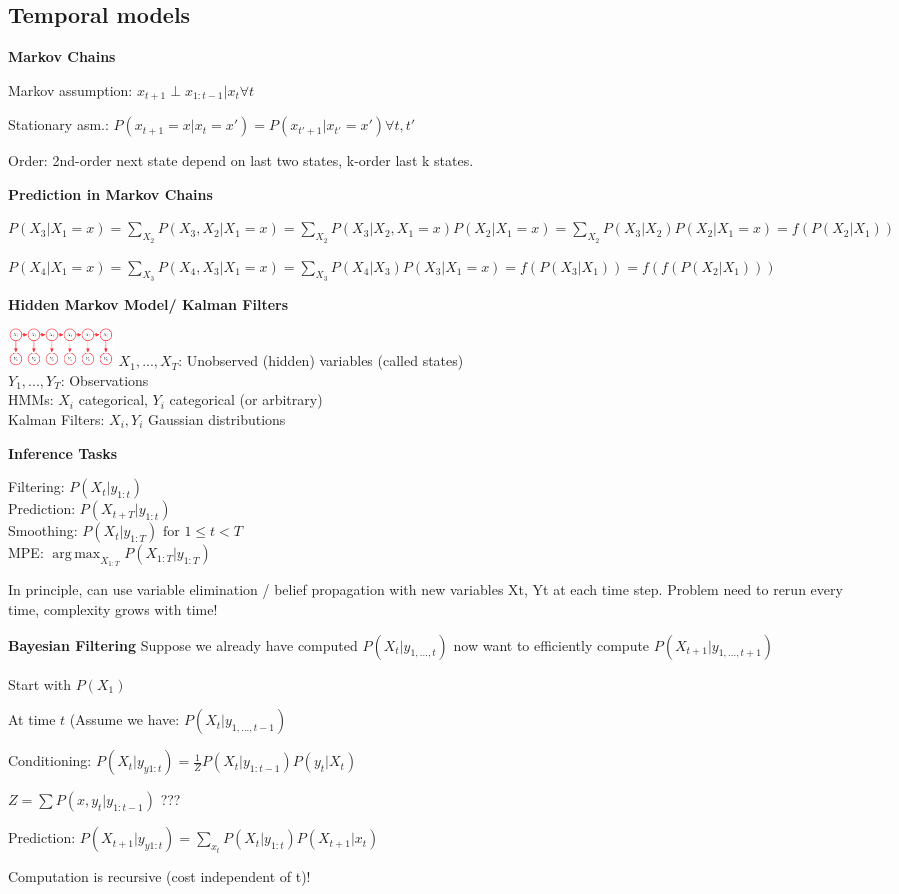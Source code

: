 \documentclass[a4paper, 11pt]{scrartcl}
\DeclareMathOperator*{\argmax}{arg\,max}
\begin{document}
\begin{multicols*}{3}
\subsection{Temporal models}

\textbf{Markov Chains}

Markov assumption: $x_{t+1} \perp x_{1:t-1} | x_t \forall t$

Stationary asm.: $P(x_{t+1} = x | x_t = x') = P(x_{t'+1} | x_{t'} = x') \forall t, t'$

Order: 2nd-order next state depend on last two states, k-order last k states. 

\textbf{Prediction in Markov Chains}

$P(X_3 | X_1 = x) = \sum_{X_2}P(X_3,X_2|X_1 = x) = \sum_{X_2}P(X_3 | X_2, X_1 = x)P(X_2 | X_1 = x) =  \sum_{X_2}P(X_3 | X_2)P(X_2 | X_1 = x) = f(P(X_2|X_1))$

$P(X_4 | X_1 = x) = \sum_{X_3}P(X_4,X_3|X_1 = x) = \sum_{X_3}P(X_4 | X_3)P(X_3 | X_1 = x) = f(P(X_3|X_1)) = f(f(P(X_2 | X_1)))$

\textbf{Hidden Markov Model/ Kalman Filters}

\includegraphics[height=1cm]{img/pai4.png}
$X_1,...,X_T$: Unobserved (hidden) variables (called states) \\
$Y_1,...,Y_T$: Observations \\
HMMs: $X_i$ categorical, $Y_i$ categorical (or arbitrary)\\
Kalman Filters: $X_i, Y_i$ Gaussian distributions

\textbf{Inference Tasks}

Filtering: $P(X_t | y_{1:t} ) $\\
Prediction: $P(X_{t+T} | y_{1:t} )$ \\
Smoothing: $P(X_t | y_{1:T}) \text{ for } 1\leq t < T$\\
MPE: $\argmax_{X_{1:T}} P(X_{1:T} | y_{1:T})$
 
In principle, can use variable elimination / belief propagation with new variables Xt, Yt at
each time step. Problem need to rerun every time, complexity grows with time!

\textbf{Bayesian Filtering}
Suppose we already have computed $P(X_t | y_{1,...,t})$ now want to efficiently compute $P(X_{t+1} | y_{1,...,t+1})$

\begin{compactitem}
	\item Start with $P(X_1)$
	\item At time $t$ (Assume we have:  $P(X_t | y_{1,...,t-1})$
	\item Conditioning: $P(X_t | y_{y1:t}) = \frac{1}{Z} P(X_t | y_{1:t-1})P(y_t | X_t)$
	\item $Z= \sum P(x,y_t | y_{1:t-1})$ ???
	\item Prediction: $P(X_{t+1} | y_{y1:t}) = \sum_{x_t}  P(X_t | y_{1:t}) P(X_{t+1} | x_t)$
\end{compactitem}
Computation is recursive (cost independent of t)!


\end{multicols*}
\end{document}
